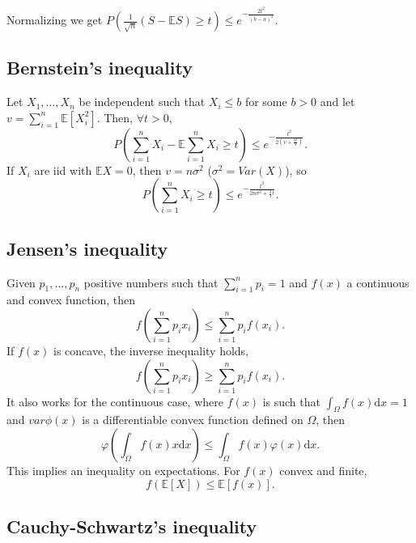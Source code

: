 \documentclass[11pt, english]{article}
\newcommand{\su}[2]{\sum\limits_{#1}^{#2}}
\begin{document}
Normalizing we get $P(\frac{1}{\sqrt{n}}(S-\mathbb{E}S)\geq t)\leq e^{-\frac{2t^2}{(b-a)^2}}$.

\subsection*{Bernstein's inequality}

Let $X_1,\dots,X_n$ be independent such that $X_i\leq b$ for some $b > 0$ and let $v=\sum\limits_{i=1}^n\mathbb{E}[X_i^2]$. Then, $\forall t>0$,
\begin{equation}
	P(\sum\limits_{i=1}^n X_i - \mathbb{E}\sum\limits_{i=1}^n X_i \geq t)\leq e^{-\frac{t^2}{2(v+\frac{bt}{3})}}.
\end{equation}
If $X_i$ are iid with $\mathbb{E}X=0$, then $v=n\sigma^2$ ($\sigma^2=Var(X)$), so
\begin{equation}
	P(\sum\limits_{i=1}^n X_i\geq t)\leq e^{-\frac{t^2}{2n\sigma^2+\frac{2}{3}t}}.
\end{equation} 


\subsection*{Jensen's inequality}

Given $p_1,\dots,p_n$ positive numbers such that $\su{i=1}{n}p_i=1$ and $f(x)$ a continuous and convex function, then
\begin{equation}
	f(\su{i=1}{n}p_ix_i)\leq \su{i=1}{n}p_if(x_i).
\end{equation}
If $f(x)$ is concave, the inverse inequality holds,
\begin{equation}
f(\su{i=1}{n}p_ix_i)\geq \su{i=1}{n}p_if(x_i).
\end{equation}
It also works for the continuous case, where $f(x)$ is such that $\int_{\Omega}f(x)\text{d}x=1$ and $var\phi(x)$ is a differentiable convex function defined on $\Omega$, then
\begin{equation}
	\varphi(\int_{\Omega}f(x)x\text{d}x)\leq \int_{\Omega} f(x)\varphi(x)\text{d}x.
\end{equation}
This implies an inequality on expectations. For $f(x)$ convex and finite,
\begin{equation}
	f(\mathbb{E}[X])\leq \mathbb{E}[f(x)].
\end{equation}


\subsection*{Cauchy-Schwartz's inequality}
\end{document}
